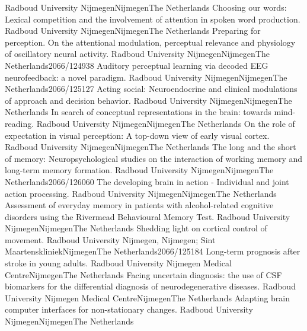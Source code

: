 	{Radboud University Nijmegen}{Nijmegen}{The Netherlands}{}
	{Choosing our words: Lexical competition and the involvement of attention in spoken word production.}
	{Radboud University Nijmegen}{Nijmegen}{The Netherlands}{}
	{Preparing for perception. On the attentional modulation, perceptual relevance and physiology of oscillatory neural activity.}
	{Radboud University Nijmegen}{Nijmegen}{The Netherlands}{2066/124938}
	{Auditory perceptual learning via decoded EEG neurofeedback: a novel paradigm.}
	{Radboud University Nijmegen}{Nijmegen}{The Netherlands}{2066/125127}
	{Acting social: Neuroendocrine and clinical modulations of approach and decision behavior.}
	{Radboud University Nijmegen}{Nijmegen}{The Netherlands}{}
	{In search of conceptual representations in the brain: towards mind-reading.}
	{Radboud University Nijmegen}{Nijmegen}{The Netherlands}{}
	{On the role of expectation in visual perception: A top-down view of early visual cortex.}
	{Radboud University Nijmegen}{Nijmegen}{The Netherlands}{}
	{The long and the short of memory: Neuropsychological studies on the interaction of working memory and long-term memory formation.}
	{Radboud University Nijmegen}{Nijmegen}{The Netherlands}{2066/126060}
	{The developing brain in action - Individual and joint action processing.}
	{Radboud University Nijmegen}{Nijmegen}{The Netherlands}{}
	{Assessment of everyday memory in patients with alcohol-related cognitive disorders using the Rivermead Behavioural Memory Test.}
	{Radboud University Nijmegen}{Nijmegen}{The Netherlands}{}
	{Shedding light on cortical control of movement.}
	{Radboud University Nijmegen, Nijmegen; Sint Maartenskliniek}{Nijmegen}{The Netherlands}{2066/125184}
	{Long-term prognosis after stroke in young adults.}
	{Radboud University Nijmegen Medical Centre}{Nijmegen}{The Netherlands}{}
	{ Facing uncertain diagnosis: the use of CSF biomarkers for the differential diagnosis of neurodegenerative diseases.}
	{Radboud University Nijmegen Medical Centre}{Nijmegen}{The Netherlands}{}
	{Adapting brain computer interfaces for non-stationary changes.}
	{Radboud University Nijmegen}{Nijmegen}{The Netherlands}{}
